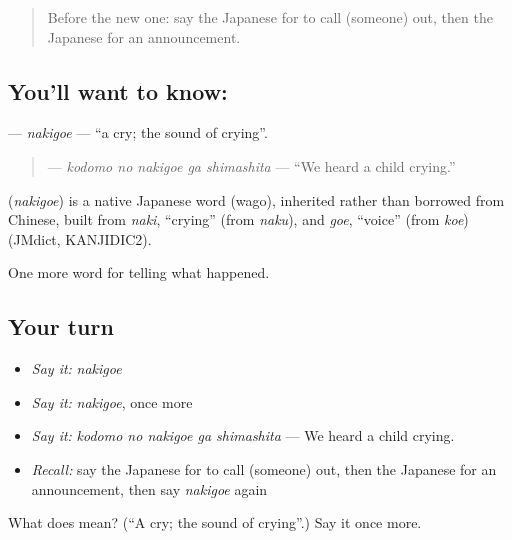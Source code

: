\label{lesson:JA-C267-nakigoe}



\begin{quote}
Before the new one: say the Japanese for to call (someone) out, then the Japanese for an announcement.
\end{quote}

\subsection*{You'll want to know: }
\textbf{} — \emph{nakigoe} — \textquotedblleft{}a cry; the sound of crying\textquotedblright{}.

\begin{quote}
\textbf{  } — \emph{kodomo no nakigoe ga shimashita} — \textquotedblleft{}We heard a child crying.\textquotedblright{}
\end{quote}

\begin{cousinweb}
\textbf{} (\emph{nakigoe}) is a native Japanese word (wago), inherited rather than borrowed from Chinese, built from \emph{naki}, \textquotedblleft{}crying\textquotedblright{} (from \emph{naku}), and \emph{goe}, \textquotedblleft{}voice\textquotedblright{} (from \emph{koe}) (JMdict, KANJIDIC2).
\end{cousinweb}

\begin{grammarlens}[title={What you've built}]
One more word for telling what happened.
\end{grammarlens}

\subsection*{Your turn}
\begin{itemize}
\raggedright
  \item \emph{Say it:} \emph{nakigoe}
  \item \emph{Say it:} \emph{nakigoe}, once more
  \item \emph{Say it:} \emph{kodomo no nakigoe ga shimashita} — We heard a child crying.
  \item \emph{Recall:} say the Japanese for to call (someone) out, then the Japanese for an announcement, then say \emph{nakigoe} again
\end{itemize}

\begin{tcolorbox}[breakable,colback=teal!4,colframe=teal!35!black,title={Before you move on}]
What does  mean? (\textquotedblleft{}A cry; the sound of crying\textquotedblright{}.) Say it once more.
\end{tcolorbox}
